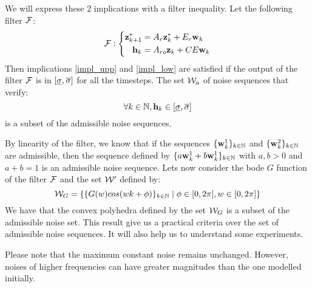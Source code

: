 We will express these 2 implications with a filter inequality.
Let the following filter $\mathcal{F}$:
\begin{equation}
\mathcal{F}:
\left\{
\begin{split}
 \mathbf{z}_{k+1}^* &= A_r  \mathbf{z}_k^* + E_r  \mathbf{w}_{k} \\
 \mathbf{h}_{k} &= A_{ro}  \mathbf{z}_k + CE  \mathbf{w}_{k} \\
\end{split}
\right.
\end{equation}
Then implications \ref{impl_upp} and \ref{impl_low} are satisfied if the output of the filter $\mathcal{F}$ is in $[\underline{\sigma},\overline{\sigma}]$ for all the timesteps.
The set $\mathcal{W}_a$ of noise sequences that verify:
\begin{equation}
\forall k \in \mathbb{N},  \mathbf{h}_k \in [\underline{\sigma},\overline{\sigma}]
\end{equation}
is a subset of the admissible noise sequences.


By linearity of the filter, we know that if the sequences $\{ \mathbf{w}_{k}^1\}_{k\in \mathbb{N}}$ and  $\{ \mathbf{w}_{k}^2\}_{k\in \mathbb{N}}$ are admissible, then the sequence defined by $\{a \mathbf{w}_{k}^1 + b \mathbf{w}_{k}^1\}_{k\in \mathbb{N}}$ with $a,b>0$ and $a+b = 1$ is an admissible noise sequence.
Lets now consider the bode $G$ function of the filter $\mathcal{F}$ and the set $\mathcal{W}'$ defined by:
$$\mathcal{W}_G = 
\{ 
\{G(w) cos(w k + \phi)\}_{k \in \mathbb{N}} 
\mid \phi \in [0,2\pi], w \in [0,2\pi] \}
$$
We have that the convex polyhedra defined by the set $\mathcal{W}_G$ is a subset of the admissible noise set.
This result give us a practical criteria over the set of admissible noise sequences.
It will also help us to understand some experiments.

Please note that the maximum constant noise remains unchanged.
However, noises of higher frequencies can have greater magnitudes than the one modelled initially. 